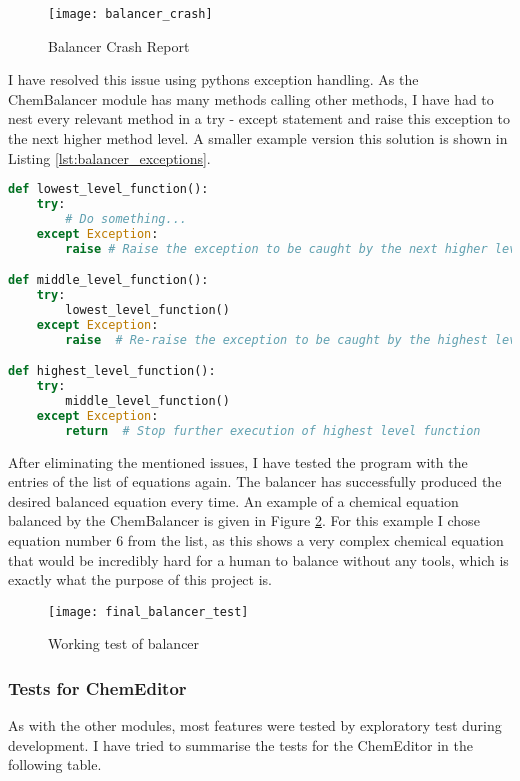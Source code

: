 \documentclass[a4paper,12pt]{article}
\begin{document}
\begin{figure} [h]
	\centering
	\texttt{[image: balancer\_crash]}
	\caption{Balancer Crash Report}
	\label{fig:balancer_crash}
\end{figure}

I have resolved this issue using pythons exception handling. As the ChemBalancer module has many methods calling other methods, I have had to nest every relevant method in a try - except statement and raise this exception to the next higher method level. A smaller example version this solution is shown in Listing \ref{lst:balancer_exceptions}.

\begin{lstlisting}[language=Python, caption=Example of exception structure, label={lst:balancer_exceptions}]
def lowest_level_function():
	try:
	    # Do something...
    except Exception:
	    raise # Raise the exception to be caught by the next higher level function

def middle_level_function():
    try:
        lowest_level_function()
    except Exception:
        raise  # Re-raise the exception to be caught by the highest level function

def highest_level_function():
    try:
        middle_level_function()
    except Exception:
        return  # Stop further execution of highest level function
\end{lstlisting}

After eliminating the mentioned issues, I have tested the program with the entries of the list of equations again. The balancer has successfully produced the desired balanced equation every time. An example of a chemical equation balanced by the ChemBalancer is given in Figure \ref{fig:final_balancer_test}. For this example I chose equation number 6 from the list, as this shows a very complex chemical equation that would be incredibly hard for a human to balance without any tools, which is exactly what the purpose of this project is.

\begin{figure} [h]
	\centering
	\texttt{[image: final\_balancer\_test]}
	\caption{Working test of balancer}
	\label{fig:final_balancer_test}
\end{figure}

\subsubsection{Tests for ChemEditor}

As with the other modules, most features were tested by exploratory test during development. I have tried to summarise the tests for the ChemEditor in the following table.
\end{document}
